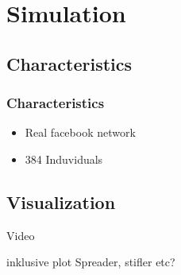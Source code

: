 \documentclass{beamer}
\begin{document}
\section{Simulation} %
\subsection{Characteristics}
\begin{frame}
\frametitle{Characteristics}

\begin{itemize}

\item Real facebook network
\vspace{1cm}
\item 384 Induviduals



\end{itemize}

\end{frame}

\subsection{Visualization}
\begin{frame}
\begin{center}
\huge{Video}

inklusive plot Spreader, stifler etc?

\end{center}
\end{frame}
\end{document}
